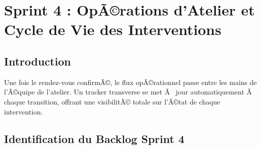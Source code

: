 ﻿%
\chapter{Sprint 4 : OpÃ©rations d'Atelier et Cycle de Vie des Interventions}


\section{Introduction}

Une fois le rendez-vous confirmÃ©, le flux opÃ©rationnel passe entre les mains de
l'Ã©quipe de l'atelier. Un tracker transverse se met Ã  jour automatiquement Ã  chaque
transition, offrant une visibilitÃ© totale sur l'Ã©tat de chaque intervention.

\section{Identification du Backlog Sprint 4}

